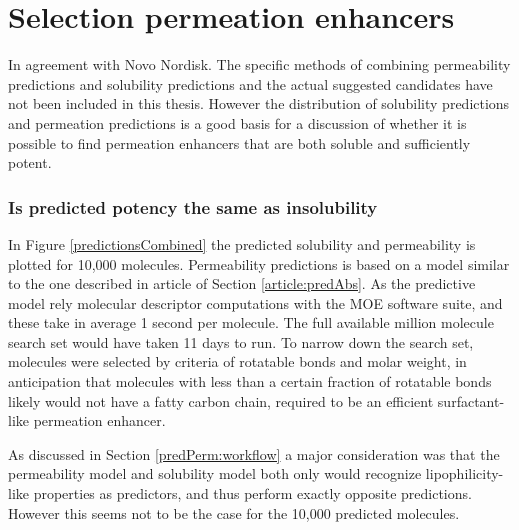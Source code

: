 \chapter{Selection permeation enhancers}

In agreement with Novo Nordisk. The specific methods of combining permeability predictions and solubility predictions and the actual suggested candidates have not been included in this thesis. However the distribution of solubility predictions and permeation predictions is a good basis for a discussion of whether it is possible to find permeation enhancers that are both soluble and sufficiently potent.


\subsection{Is predicted potency the same as insolubility}
In Figure \ref{predictionsCombined} the predicted solubility and permeability is plotted for 10,000 molecules. Permeability predictions is based on a model similar to the one described in article of Section \ref{article:predAbs}. As the predictive model rely molecular descriptor computations with the MOE software suite, and these take in average 1 second per molecule. The full available million molecule search set would have taken 11 days to run. To narrow down the search set, molecules were selected by criteria of rotatable bonds and molar weight, in anticipation that molecules with less than a certain fraction of rotatable bonds likely would not have a fatty carbon chain, required to be an efficient surfactant-like permeation enhancer.

As discussed in Section \ref{predPerm:workflow} a major consideration was that the permeability model and solubility model both only would recognize lipophilicity-like properties as predictors, and thus perform exactly opposite predictions. However this seems not to be the case for the 10,000 predicted molecules. 

